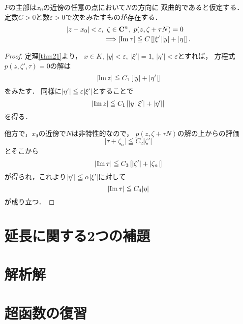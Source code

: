 \begin{THM}\label{thm23}
    \(P\)の主部は\(x_0\)の近傍の任意の点において\(N\)の方向に
    双曲的であると仮定する．
    定数\(C>0\)と数\(\varepsilon>0\)で次をみたすものが存在する．
    \[\begin{multlined}
        \lvert{z-x_0}\rvert<\varepsilon,\ 
        \zeta\in\cc^{n},\ 
        p(z,\zeta+\tau N)=0\\
        \Longrightarrow
        \lvert{\im{\tau}}\rvert
        \leqq
        C\left[\lvert{\xi'}\rvert\lvert{y}\rvert+\lvert{\eta}\rvert\right].
    \end{multlined}\]
\end{THM}

\begin{proof}
    定理\ref{thm21}より，
    \(x\in K\), \(\lvert{y}\rvert<\varepsilon\), 
    \(\lvert{\xi'}\rvert=1\), 
    \(\lvert{\eta'}\rvert<\varepsilon\)とすれば，
    方程式\(p(z,\zeta',\tau)=0\)の解は
    \[
        \lvert\mathop{\mathrm{Im}}\nolimits{z}\rvert
        \leqq 
        C_{1}\left[
            \lvert{y}\rvert+\lvert{\eta'}\rvert
        \right]
    \]をみたす．
    同様に\(
        \lvert{\eta'}\rvert
        \leqq\varepsilon\lvert\xi'\rvert
    \)とすることで\[
        \lvert\mathop{\mathrm{Im}}\nolimits{z}\rvert
        \leqq 
        C_{1}\left[
            \lvert{y}\rvert\lvert\xi'\rvert+\lvert{\eta'}\rvert
        \right]
    \]を得る．

    他方で，\(x_0\)の近傍で\(N\)は非特性的なので，
    \(p(z,\zeta+\tau N)\)の解の上からの評価\[
        \lvert{\tau+\zeta_n}\rvert\leqq C_2\lvert{\zeta'}\rvert
    \]とそこから\[
        \lvert{\mathop{\mathrm{Im}}\nolimits{\tau}}\rvert\leqq C_3\left[\lvert{\zeta'}\rvert+\lvert{\zeta_n}\rvert\right]
    \]が得られ，これより\(
        \lvert{\eta'}\rvert\leqq\alpha\lvert{\xi'}\rvert
    \)に対して\[
        \lvert{\mathop{\mathrm{Im}}\nolimits{\tau}}\rvert\leqq C_4\lvert{\eta}\rvert
    \]が成り立つ．
\end{proof}
\section{延長に関する2つの補題}

\section{解析解}

\section{超函数の復習}

